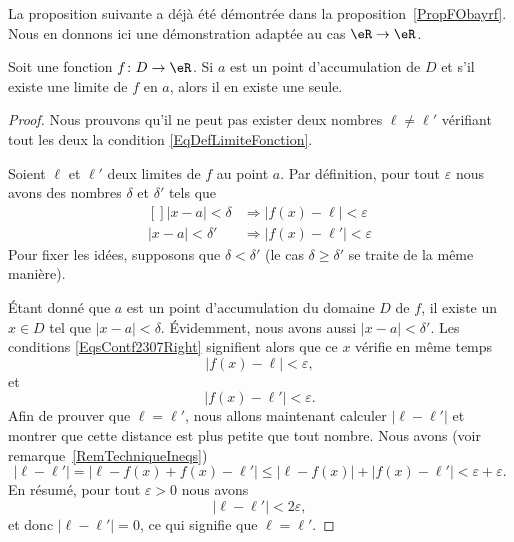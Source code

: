 La proposition suivante a déjà été démontrée dans la proposition~\ref{PropFObayrf}. Nous en donnons ici une démonstration adaptée au cas \( \eR\to \eR\).

\begin{proposition}
	Soit une fonction $f\colon D\to \eR$. Si $a$ est un point d'accumulation de $D$ et s'il existe une limite de $f$ en $a$, alors il en existe une seule.
\end{proposition}


\begin{proof}
    Nous prouvons qu'il ne peut pas exister deux nombres $\ell\neq\ell'$ vérifiant tout les deux la condition \eqref{EqDefLimiteFonction}.

	Soient $\ell$ et $\ell'$ deux limites de $f$ au point $a$. Par définition, pour tout $\varepsilon$ nous avons des nombres $\delta$ et $\delta'$ tels que
	\begin{equation}	\label{EqsContf2307Right}
		\begin{aligned}[]
			| x-a |<\delta&\Rightarrow \big| f(x)-\ell \big|<\varepsilon\\
			| x-a |<\delta'&\Rightarrow \big| f(x)-\ell' \big|<\varepsilon
		\end{aligned}
	\end{equation}
	Pour fixer les idées, supposons que $\delta<\delta'$ (le cas $\delta\geq\delta'$ se traite de la même manière).

	Étant donné que $a$ est un point d'accumulation du domaine $D$ de $f$, il existe un $x\in D$ tel que $| x-a |<\delta$. Évidemment, nous avons aussi $| x-a |<\delta'$. Les conditions \eqref{EqsContf2307Right} signifient alors que ce $x$ vérifie en même temps
	\begin{equation}
		| f(x)-\ell |<\varepsilon,
	\end{equation}
	et
	\begin{equation}
		| f(x)-\ell' |<\varepsilon.
	\end{equation}
	Afin de prouver que $\ell=\ell'$, nous allons maintenant calculer $| \ell-\ell' |$ et montrer que cette distance est plus petite que tout nombre. Nous avons (voir remarque~\ref{RemTechniqueIneqs})
	\begin{equation}	\label{EqInesq2307ellellepr}
		| \ell-\ell' |=| \ell-f(x)+f(x)-\ell' |\leq | \ell-f(x) |+| f(x)-\ell' |<\varepsilon+\varepsilon.
	\end{equation}
	En résumé, pour tout $\varepsilon>0$ nous avons
	\begin{equation}
		| \ell-\ell' |<2\varepsilon,
	\end{equation}
	et donc $| \ell-\ell' |=0$, ce qui signifie que $\ell=\ell'$.
\end{proof}

